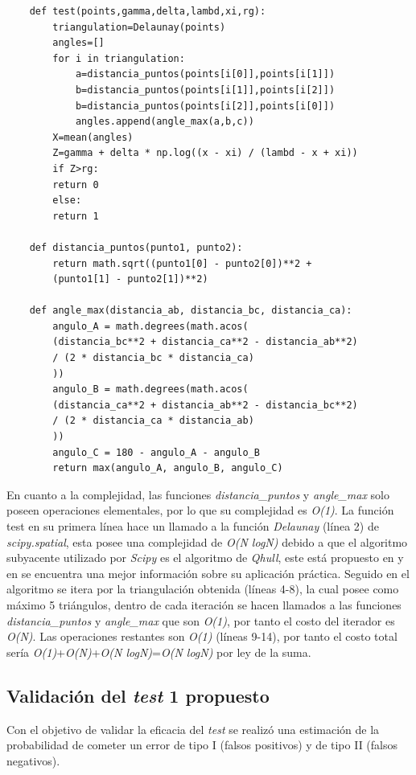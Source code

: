 \documentclass[12pt]{report}
\begin{document}
\begin{lstlisting}
	def test(points,gamma,delta,lambd,xi,rg):
		triangulation=Delaunay(points)
		angles=[]
		for i in triangulation:
			a=distancia_puntos(points[i[0]],points[i[1]])
			b=distancia_puntos(points[i[1]],points[i[2]])
			b=distancia_puntos(points[i[2]],points[i[0]])
			angles.append(angle_max(a,b,c))
		X=mean(angles)
		Z=gamma + delta * np.log((x - xi) / (lambd - x + xi))
		if Z>rg:
		return 0
		else:
		return 1
	
	def distancia_puntos(punto1, punto2):
		return math.sqrt((punto1[0] - punto2[0])**2 +
		(punto1[1] - punto2[1])**2)
	
	def angle_max(distancia_ab, distancia_bc, distancia_ca):
		angulo_A = math.degrees(math.acos(
		(distancia_bc**2 + distancia_ca**2 - distancia_ab**2) 
		/ (2 * distancia_bc * distancia_ca)
		))
		angulo_B = math.degrees(math.acos(
		(distancia_ca**2 + distancia_ab**2 - distancia_bc**2) 
		/ (2 * distancia_ca * distancia_ab)
		))
		angulo_C = 180 - angulo_A - angulo_B  
		return max(angulo_A, angulo_B, angulo_C)
\end{lstlisting}

En cuanto a la complejidad, las funciones \textit{distancia\_puntos} y \textit{angle\_max} solo poseen operaciones elementales, por lo que su complejidad es \textit{O(1)}. La función test en su primera línea hace un llamado a la función  \textit{Delaunay} (línea 2) de \textit{scipy.spatial}, esta posee una complejidad de \textit{O(N logN)} debido a que el algoritmo subyacente utilizado por \textit{Scipy} es el algoritmo de \textit{Qhull}, este está propuesto en \cite{31} y en \cite{32} se encuentra una mejor información sobre su aplicación práctica. Seguido en el algoritmo se itera por la triangulación obtenida (líneas 4-8), la cual posee como máximo 5 triángulos, dentro de cada iteración se hacen llamados a las  funciones \textit{distancia\_puntos} y \textit{angle\_max}  que son \textit{O(1)}, por tanto el costo del iterador es \textit{O(N)}. Las operaciones restantes son \textit{O(1)} (líneas 9-14), por tanto el costo total sería \textit{O(1)}+\textit{O(N)}+\textit{O(N logN)}=\textit{O(N logN)} por ley de la suma.
\subsection{Validación del \textit{test} 1 propuesto}
\label{sec:1.4}
	
	Con el objetivo de validar la eficacia del \textit{test} se realizó una estimación de la probabilidad de cometer un error de tipo I (falsos positivos) y de tipo II (falsos negativos).
		 
\end{document}
